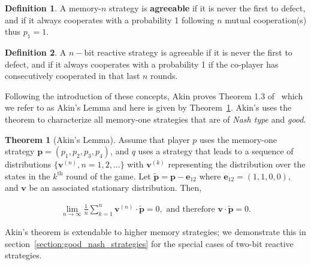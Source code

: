 \documentclass{article}
\theoremstyle{definition}
\newtheorem{definition}{Definition}[section]
\newtheorem{theorem}{Theorem}[section]
\begin{document}
\begin{definition}\label{definition:memn_agreeable}
  A memory-\(n\) strategy is \textbf{agreeable} if it is never the first to defect,
  and if it always cooperates with a probability 1 following \(n\) mutual cooperation(s) thus
  \(p_1=1\).
\end{definition}

\begin{definition}\label{definition:nbit_agreeable} A \(n-\)bit reactive strategy is
agreeable if it is never the first to defect,
and if it always cooperates with a probability 1 if the co-player has consecutively cooperated in that last \(n\) rounds.
\end{definition}

Following the introduction of these concepts, Akin proves Theorem 1.3
of~\citep{akin:EGADS:2016} which we refer to as Akin's Lemma and here is given
by Theorem~\ref{theorem:akin}. Akin's uses the theorem to characterize all memory-one
strategies that are of \textit{Nash type} and \textit{good}.

\begin{theorem}[Akin's Lemma]\label{theorem:akin}
  Assume that player \(p\) uses the memory-one strategy \(\mathbf{p}=(p_1, p_2, p_3, p_4)\),
  and \(q\) uses a strategy that leads to a sequence
  of distributions \(\{\mathbf{v}^{(n)}, n = 1, 2, ...\}\) with \(\mathbf{v}^{(k)}\) representing the
  distribution over the states in the \(k^{\text{th}}\) round of the game. Let  \(\mathbf{\tilde{p}} = \mathbf{p} - \mathbf{e}_{12}\) where
  \(\mathbf{e}_{12} = (1, 1, 0, 0)\), and
  \(\mathbf{v}\) be an associated stationary distribution. Then,

  \begin{align}
    \lim_{n \rightarrow \infty} \frac{1}{n} \sum_{k=1}^{n} \mathbf{v}^{(n)} \cdot \mathbf{\tilde{p}} = 0, \text{ and therefore } \mathbf{v} \cdot \mathbf{\tilde{p}} = 0.
  \end{align}
\end{theorem}

Akin's theorem is extendable to higher memory strategies; we demonstrate this in section~\ref{section:good_nash_strategies}
for the special cases of two-bit reactive strategies.
\end{document}
